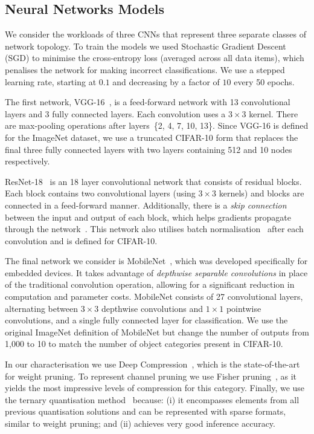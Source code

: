 \documentclass[conference]{IEEEtran}
\begin{document}
\subsection{Neural Networks Models}\label{sec:hyperparameters}

We consider the workloads of three CNNs that represent three separate classes of network topology. To train the models we used Stochastic Gradient Descent (SGD) to minimise the cross-entropy loss (averaged across all data items), which penalises the network for making incorrect classifications. We use a stepped learning rate, starting at $0.1$ and decreasing by a factor of $10$ every 50 epochs. 

The first network, VGG-16~\cite{vgg}, is a feed-forward network with 13 convolutional layers and 3 fully connected layers. Each convolution uses a $3\times3$ kernel. There are max-pooling operations after layers~\{2, 4, 7, 10, 13\}. Since VGG-16 is defined for the ImageNet dataset, we use a truncated CIFAR-10 form that replaces the final three fully connected layers with two layers containing 512 and 10 nodes respectively.

ResNet-18~\cite{he2016deep} is an 18 layer convolutional network that consists of residual blocks. Each block contains two convolutional layers (using $3\times3$ kernels) and blocks are connected in a feed-forward manner. Additionally, there is a \textit{skip connection} between the input and output of each block, which helps gradients propagate through the network~\cite{shatteredgradients2017}. This network also utilises batch normalisation~\cite{ioffe2015batch} after each convolution and is defined for CIFAR-10.

The final network we consider is MobileNet~\cite{mobilenet}, which was developed specifically for embedded devices. It takes advantage of \textit{depthwise separable convolutions} in place of the traditional convolution operation, allowing for a significant reduction in computation and parameter costs. MobileNet consists of 27 convolutional layers, alternating between $3\times3$ depthwise convolutions and $1\times1$ pointwise convolutions, and a single fully connected layer for classification. We use the original ImageNet definition of MobileNet but change the number of outputs from 1,000 to 10 to match the number of object categories present in CIFAR-10.


In our characterisation we use Deep Compression~\cite{han2015deep}, which is the state-of-the-art for weight pruning. To represent channel pruning we use Fisher pruning~\cite{theis2018faster,molchanov2016pruning}, as it yields the most impressive levels of compression for this category. Finally, we use the ternary quantisation method~\cite{zhu_2017_trained} because: (i) it encompasses elements from all previous quantisation solutions and can be represented with sparse formats, similar to weight pruning; and (ii) achieves very good inference accuracy.
\end{document}

